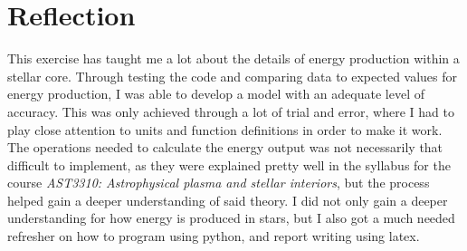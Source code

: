 \documentclass[10pt, nofootinbib, twocolumn]{revtex4-1}
\begin{document}
\section{Reflection}\label{sec:reflection}
This exercise has taught me a lot about the details of energy production within a stellar core. Through testing the code and comparing data to expected values for energy production, I was able to develop a model with an adequate level of accuracy. This was only achieved through a lot of trial and error, where I had to play close attention to units and function definitions in order to make it work. The operations needed to calculate the energy output was not necessarily that difficult to implement, as they were explained pretty well in the syllabus for the course \textit{AST3310: Astrophysical plasma and stellar interiors}, but the process helped gain a deeper understanding of said theory. I did not only gain a deeper understanding for how energy is produced in stars, but I also got a much needed refresher on how to program using python, and report writing using latex. 







\end{document}
